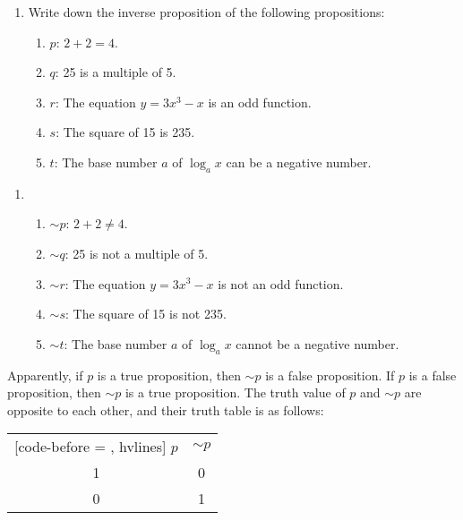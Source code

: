 \documentclass{report}
\begin{document}
\vspace{0.5cm}
\begin{enumerate}[label=\textbf{Example \arabic*}, leftmargin=*]
    \item Write down the inverse proposition of the following propositions:
          \begin{enumerate}[label=, leftmargin=*]
              \item $p$: $2 + 2 = 4$.
              \item $q$: 25 is a multiple of 5.
              \item $r$: The equation $y = 3x^3 - x$ is an odd function.
              \item $s$: The square of 15 is 235.
              \item $t$: The base number $a$ of $\log_a x$ can be a negative number.
          \end{enumerate}
\end{enumerate}
\begin{enumerate}[label=\textbf{Sol.}]
    \item \begin{enumerate}[label=, leftmargin=*]
              \item $\sim p$: $2 + 2 \neq 4$.
              \item $\sim q$: 25 is not a multiple of 5.
              \item $\sim r$: The equation $y = 3x^3 - x$ is not an odd function.
              \item $\sim s$: The square of 15 is not 235.
              \item $\sim t$: The base number $a$ of $\log_a x$ cannot be a negative number.
          \end{enumerate}
\end{enumerate}

Apparently, if $p$ is a true proposition, then $\sim p$ is a false proposition.
If $p$ is a false proposition, then $\sim p$ is a true proposition. The truth
value of $p$ and $\sim p$ are opposite to each other, and their truth table is
as follows:
\begin{center}
    \begin{NiceTabular}{|c|c|}[code-before = , hvlines]
        $p$ & $\sim p$ \\
        1   & 0        \\
        0   & 1        \\
    \end{NiceTabular}
\end{center}
\end{document}
